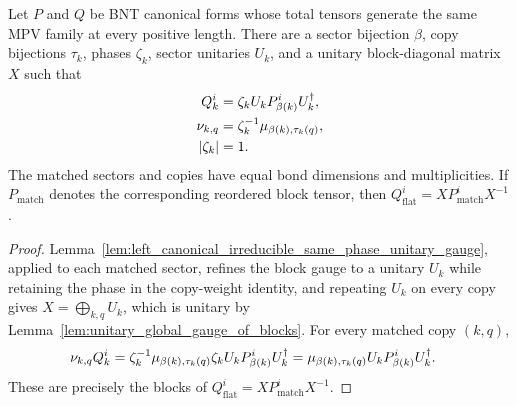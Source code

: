 \begin{lemma}
    \label{lem:sector_bnt_equal_unitary_matched_gauge}
    \leanok
    Let $P$ and $Q$ be BNT canonical forms whose total tensors generate the
    same MPV family at every positive length. There are a sector bijection
    $\beta$, copy bijections $\tau_k$, phases $\zeta_k$, sector unitaries $U_k$,
    and a unitary block-diagonal matrix $X$ such that
    \begin{align}
        Q_k^i
         & = \zeta_k U_kP_{\beta(k)}^iU_k^\dagger,
        \notag                                     \\
        \nu_{k,q}
         & = \zeta_k^{-1}\mu_{\beta(k),\tau_k(q)},
        \notag                                     \\
        |\zeta_k|
         & = 1.
        \notag
    \end{align}
    The matched sectors and copies have equal bond dimensions and
    multiplicities. If $P_{\mathrm{match}}$ denotes the corresponding
    reordered block tensor, then
    $Q_{\mathrm{flat}}^i=XP_{\mathrm{match}}^iX^{-1}$.
\end{lemma}
\begin{proof}\leanok
    Lemma~\ref{lem:left_canonical_irreducible_same_phase_unitary_gauge},
    applied to each matched sector, refines the block gauge to a unitary $U_k$
    while retaining the phase in the copy-weight identity, and repeating $U_k$
    on every copy gives $X=\bigoplus_{k,q}U_k$, which is unitary by
    Lemma~\ref{lem:unitary_global_gauge_of_blocks}. For every matched copy
    $(k,q)$,
    \begin{align}
        \nu_{k,q}Q_k^i
         & = \zeta_k^{-1}\mu_{\beta(k),\tau_k(q)}
        \zeta_k U_kP_{\beta(k)}^iU_k^\dagger
        = \mu_{\beta(k),\tau_k(q)}U_kP_{\beta(k)}^iU_k^\dagger.
        \notag
    \end{align}
    These are precisely the blocks of
    $Q_{\mathrm{flat}}^i=XP_{\mathrm{match}}^iX^{-1}$.
\end{proof}
